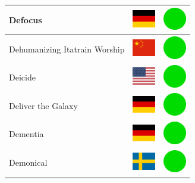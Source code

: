 \documentclass[12pt, a4paper, twoside]{report}
\begin{document}
\begin{center}
\begin{longtable}{|p{5cm}|p{2cm}|p{2cm}|}
 Defocus                                                    & \includegraphics[width=1cm]{../4x3/de} &   \includegraphics[width=1cm]{../likes/y} \\ \hline
 Dehumanizing Itatrain Worship                              & \includegraphics[width=1cm]{../4x3/cn} &   \includegraphics[width=1cm]{../likes/y} \\ \hline
 Deicide                                                    & \includegraphics[width=1cm]{../4x3/us} &   \includegraphics[width=1cm]{../likes/y} \\ \hline
 Deliver the Galaxy                                         & \includegraphics[width=1cm]{../4x3/de} &   \includegraphics[width=1cm]{../likes/y} \\ \hline
 Dementia                                                   & \includegraphics[width=1cm]{../4x3/de} &   \includegraphics[width=1cm]{../likes/y} \\ \hline
 Demonical                                                  & \includegraphics[width=1cm]{../4x3/se} &   \includegraphics[width=1cm]{../likes/y} \\ \hline

\end{longtable}
\end{center}
\end{document}
